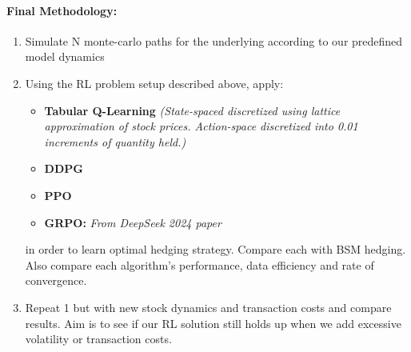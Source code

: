 \documentclass{article}
\begin{document}
\paragraph{Final Methodology:} 
\begin{enumerate}
    \item Simulate N monte-carlo paths for the underlying according to our predefined model dynamics
    \item Using the RL problem setup described above, apply:
    \begin{itemize}
        \item \textbf{Tabular Q-Learning} \textit{(State-spaced discretized using lattice approximation of stock prices. Action-space discretized into 0.01 increments of quantity held.)}
        \item \textbf{DDPG}
        \item \textbf{PPO}
        \item \textbf{GRPO:} \textwidth{May be more effective as it doesn't need to learn the critic function which can be difficult due to stochasticity of transaction costs. By using only observed Monte Carlo methods it may be better at dealing with the constraints of the problem. Although it may be potentially unstable at points with high variance we are hoping to see if running a numerous amount of trials will help normalize these results.} \textit{ From DeepSeek 2024 paper}
    \end{itemize}
    in order to learn optimal hedging strategy. Compare each with BSM hedging. Also compare each algorithm's performance, data efficiency and rate of convergence.
    \item Repeat 1 but with new stock dynamics and transaction costs and compare results. Aim is to see if our RL solution still holds up when we add excessive volatility or transaction costs.
\end{enumerate}
\end{document}
